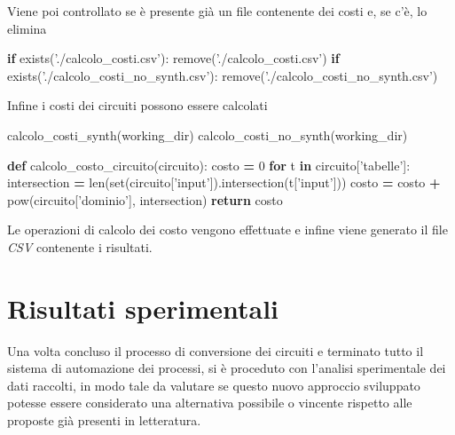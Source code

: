 \documentclass[italian,]{book}
\newenvironment{Shaded}{\begin{snugshade}}{\end{snugshade}}
\newcommand{\BuiltInTok}[1]{#1}
\newcommand{\ControlFlowTok}[1]{\textcolor[rgb]{0.13,0.29,0.53}{\textbf{#1}}}
\newcommand{\DecValTok}[1]{\textcolor[rgb]{0.00,0.00,0.81}{#1}}
\newcommand{\KeywordTok}[1]{\textcolor[rgb]{0.13,0.29,0.53}{\textbf{#1}}}
\newcommand{\NormalTok}[1]{#1}
\newcommand{\OperatorTok}[1]{\textcolor[rgb]{0.81,0.36,0.00}{\textbf{#1}}}
\newcommand{\StringTok}[1]{\textcolor[rgb]{0.31,0.60,0.02}{#1}}
\begin{document}
\newpage

Viene poi controllato se è presente già un file contenente dei costi e, se c'è, lo elimina

\begin{Shaded}
\begin{Highlighting}[]
\ControlFlowTok{if}\NormalTok{ exists(}\StringTok{'./calcolo_costi.csv'}\NormalTok{):}
\NormalTok{    remove(}\StringTok{'./calcolo_costi.csv'}\NormalTok{)}
\ControlFlowTok{if}\NormalTok{ exists(}\StringTok{'./calcolo_costi_no_synth.csv'}\NormalTok{):}
\NormalTok{    remove(}\StringTok{'./calcolo_costi_no_synth.csv'}\NormalTok{)}
\end{Highlighting}
\end{Shaded}

Infine i costi dei circuiti possono essere calcolati

\begin{Shaded}
\begin{Highlighting}[]
\NormalTok{calcolo_costi_synth(working_dir)}
\NormalTok{calcolo_costi_no_synth(working_dir)}

\KeywordTok{def}\NormalTok{ calcolo_costo_circuito(circuito):}
\NormalTok{  costo }\OperatorTok{=} \DecValTok{0}
  \ControlFlowTok{for}\NormalTok{ t }\KeywordTok{in}\NormalTok{ circuito[}\StringTok{'tabelle'}\NormalTok{]:}
\NormalTok{    intersection }\OperatorTok{=} \BuiltInTok{len}\NormalTok{(}\BuiltInTok{set}\NormalTok{(circuito[}\StringTok{'input'}\NormalTok{]).intersection(t[}\StringTok{'input'}\NormalTok{]))}
\NormalTok{    costo }\OperatorTok{=}\NormalTok{ costo }\OperatorTok{+} \BuiltInTok{pow}\NormalTok{(circuito[}\StringTok{'dominio'}\NormalTok{], intersection)}
  \ControlFlowTok{return}\NormalTok{ costo}
\end{Highlighting}
\end{Shaded}

Le operazioni di calcolo dei costo vengono effettuate e infine viene generato il file \emph{CSV} contenente i risultati.

\hypertarget{risultati-sperimentali}{%
\chapter{Risultati sperimentali}\label{risultati-sperimentali}}

Una volta concluso il processo di conversione dei circuiti e terminato tutto il sistema di automazione dei processi, si è proceduto con l'analisi sperimentale dei dati raccolti, in modo tale da valutare se questo nuovo approccio sviluppato potesse essere considerato una alternativa possibile o vincente rispetto alle proposte già presenti in letteratura.
\end{document}
